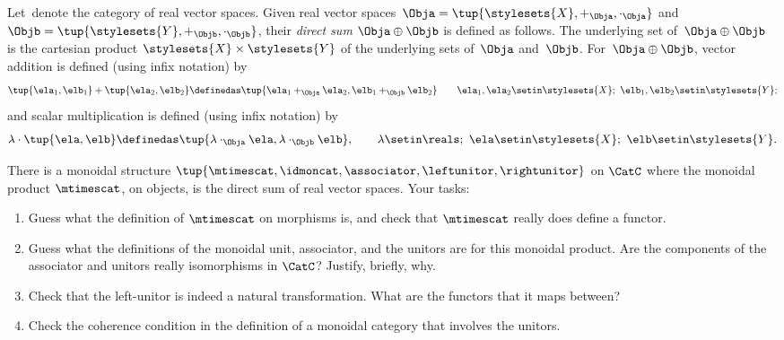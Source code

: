 \begin{gradedexercise}
    \label{ex:MonoidalProductVectDirectSum}

    Let~\CatC denote the category of real vector spaces.
    Given real vector spaces~$\Obja = \tup{\stylesets{X}, {{+_\Obja}}, \cdot_\Obja}$ and~$\Objb = \tup{\stylesets{Y}, +_\Objb, \cdot_\Objb}$, their \emph{direct sum} $\Obja \oplus \Objb$ is defined as follows.
    The underlying set of~$\Obja \oplus \Objb$ is the cartesian product $\stylesets{X} \times \stylesets{Y}$ of the underlying sets of~$\Obja$ and~$\Objb$.
    For~$\Obja \oplus \Objb$, vector addition is defined (using infix notation) by
    \begin{equation}
        \tup{\ela_1, \elb_1} + \tup{\ela_2, \elb_2} \definedas \tup{\ela_1 +_\Obja \ela_2, \elb_1 +_\Objb \elb_2} \quad \quad \ela_1, \ela_2 \setin\stylesets{X}; \ \elb_1, \elb_2 \setin\stylesets{Y};
    \end{equation}
    and scalar multiplication is defined (using infix notation) by
    \begin{equation}
        \lambda \cdot \tup{\ela, \elb} \definedas \tup{\lambda \cdot_\Obja \ela, \lambda \cdot_\Objb \elb}, \quad \quad \lambda \setin\reals; \ \ela \setin\stylesets{X}; \ \elb \setin\stylesets{Y}.
    \end{equation}

    There is a monoidal structure $\tup{\mtimescat, \idmoncat, \associator, \leftunitor, \rightunitor}$ on $\CatC$ where the monoidal product $\mtimescat$, on objects, is the direct sum of real vector spaces.
    Your tasks:
    \begin{enumerate}
        \item Guess what the definition of $\mtimescat$ on morphisms is, and check that $\mtimescat$ really does define a functor.
        \item Guess what the definitions of the monoidal unit, associator, and the unitors are for this monoidal product.
              Are the components of the associator and unitors really isomorphisms in $\CatC$? Justify, briefly, why.
        \item Check that the left-unitor is indeed a natural transformation.
              What are the functors that it maps between?
        \item Check the coherence condition in the definition of a monoidal category that involves the unitors.
    \end{enumerate}
\end{gradedexercise}

